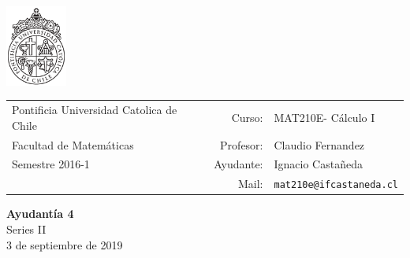 \documentclass[12pt]{article}
\makeatletter
\newcommand{\ayudantia}{{\sc Ayudantía 4}}
\newcommand{\tituloayu}{Series II}
\newcommand{\fecha}{3 de septiembre de 2019}
\newcommand{\sigla}{MAT210E}
\newcommand{\nombre}{Cálculo I}
\newcommand{\profesor}{Claudio Fernandez}
\newcommand{\ano}{2016}
\newcommand{\semestre}{1}
\newcommand{\mail}{mat210e@ifcastaneda.cl}
\makeatother
\begin{document}
\thispagestyle{empty}

\begin{minipage}{2cm}
	\includegraphics[width=2cm]{../../../../img/logo.pdf}
	\vspace{0.5cm}
\end{minipage}
\begin{minipage}{\linewidth}
	\begin{tabular}{lrl}
		{\scriptsize\sc Pontificia Universidad Catolica de Chile} & \hspace*{0.7in}Curso: &
		\sigla  - \nombre\\
		{\sc Facultad de Matemáticas}&
		Profesor: & \profesor \\
		{\sc Semestre \ano-\semestre} & Ayudante: & {Ignacio Castañeda}\\
		& {Mail:} & \texttt{\mail}
	\end{tabular}
\end{minipage}

\vspace{-10mm}
\begin{center}
	{\LARGE\bf \ayudantia}\\
	\vspace{0.1cm}
	{\tituloayu}\\
	\vspace{0.1cm}
	\fecha\\
	\vspace{0.4cm}
\end{center}
\end{document}
